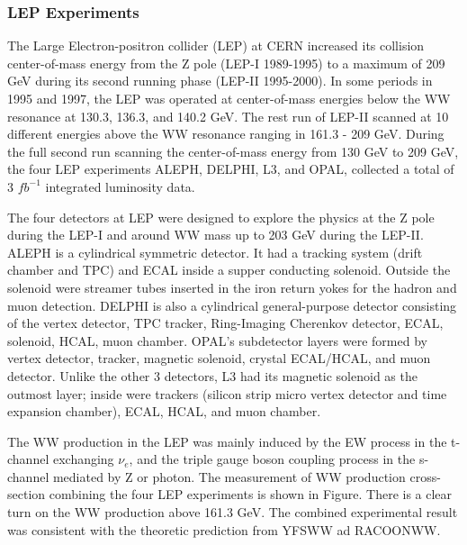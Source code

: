 \subsubsection{LEP Experiments}
The Large Electron-positron collider (LEP) at CERN increased its collision center-of-mass energy from the Z pole (LEP-I 1989-1995) to a maximum of 209 GeV during its second running phase (LEP-II 1995-2000). In some periods in 1995 and 1997, the LEP was operated at center-of-mass energies below the WW resonance at 130.3, 136.3, and 140.2 GeV. The rest run of LEP-II scanned at 10 different energies above the WW resonance ranging in 161.3 - 209 GeV. During the full second run scanning the center-of-mass energy from 130 GeV to 209 GeV, the four LEP experiments ALEPH, DELPHI, L3, and OPAL, collected a total of 3 $fb^{-1}$ integrated luminosity data. 

The four detectors at LEP were designed to explore the physics at the Z pole during the LEP-I and around WW mass up to 203 GeV during the LEP-II. ALEPH is a cylindrical symmetric detector. It had a tracking system  (drift chamber and TPC) and ECAL inside a supper conducting solenoid. Outside the solenoid were streamer tubes inserted in the iron return yokes for the hadron and muon detection. DELPHI is also a cylindrical general-purpose detector consisting of the vertex detector, TPC tracker, Ring-Imaging Cherenkov detector, ECAL, solenoid, HCAL, muon chamber. OPAL's subdetector layers were formed by vertex detector, tracker, magnetic solenoid, crystal ECAL/HCAL, and muon detector. Unlike the other 3 detectors, L3 had its magnetic solenoid as the outmost layer; inside were trackers (silicon strip micro vertex detector and time expansion chamber), ECAL, HCAL, and muon chamber. 

The WW production in the LEP was mainly induced by the EW process in the t-channel exchanging $\nu_e$, and the triple gauge boson coupling process in the s-channel mediated by Z or photon. The measurement of WW production cross-section combining the four LEP experiments is shown in Figure. There is a clear turn on the WW production above 161.3 GeV. The combined experimental result was consistent with the theoretic prediction from YFSWW ad RACOONWW.

